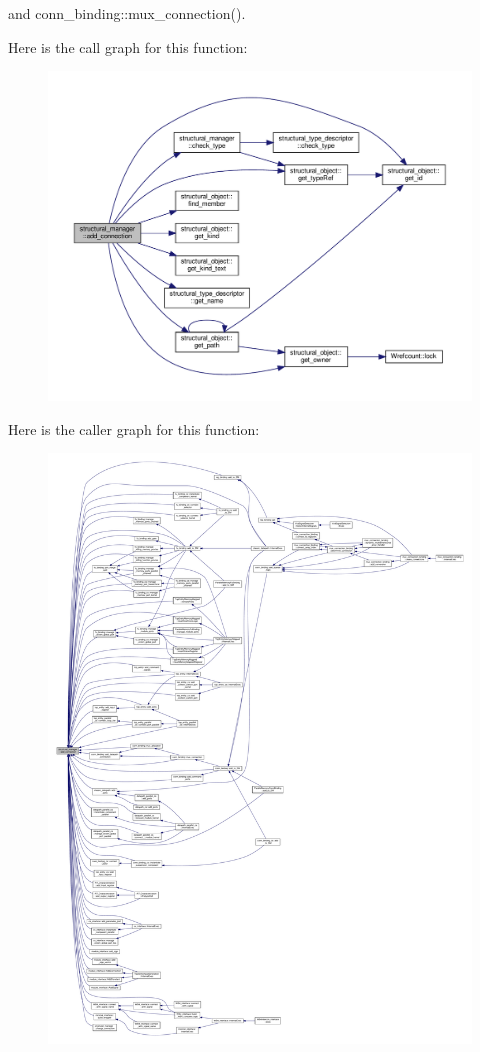 and conn\+\_\+binding\+::mux\+\_\+connection().

Here is the call graph for this function\+:
\nopagebreak
\begin{figure}[H]
\begin{center}
\leavevmode
\includegraphics[width=350pt]{d7/d6b/classstructural__manager_a7e4096354c807a693c242cf296ec2d6d_cgraph}
\end{center}
\end{figure}
Here is the caller graph for this function\+:
\nopagebreak
\begin{figure}[H]
\begin{center}
\leavevmode
\includegraphics[width=350pt]{d7/d6b/classstructural__manager_a7e4096354c807a693c242cf296ec2d6d_icgraph}
\end{center}
\end{figure}
